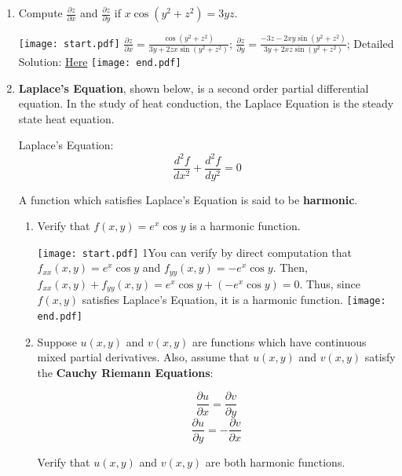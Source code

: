 \documentclass[12pt]{article}
\begin{document}
\begin{enumerate}
\item Compute $\frac{\partial z}{\partial x}$ and $\frac{\partial z}{\partial y}$ if $x\cos{(y^2+z^2)}=3yz$.

\texttt{[image: start.pdf]}
{{$\frac{\partial z}{\partial x}=\frac{\cos{(y^2+z^2)}}{3y+2zx\sin{(y^2+z^2)}}$; $\frac{\partial z}{\partial y}=\frac{-3z-2xy\sin{(y^2+z^2)}}{3y+2xz\sin{(y^2+z^2)}}$; Detailed Solution: \textcolor{blue}{\href{http://www.math.drexel.edu/classes/Calculus/resources/Math200HW/Solutions/10_200_Partial_17.pdf}{Here}} }}
\texttt{[image: end.pdf]}


\item {\bf Laplace's Equation}, shown below, is a second order partial differential equation.  In the study of heat conduction, the Laplace Equation is the steady state heat equation.
\begin{center}
Laplace's Equation:
$$\frac{d^2f}{dx^2}+\frac{d^2f}{dy^2}=0$$
\end{center}

A function which satisfies Laplace's Equation is said to be {\bf harmonic}.

\begin{enumerate}

\item Verify that $f(x,y)=e^x\cos{y}$ is a harmonic function.

\texttt{[image: start.pdf]}
{{{1\linewidth}{You can verify by direct computation that $f_{xx}(x,y)=e^x\cos{y}$ and $f_{yy}(x,y)=-e^x\cos{y}$.  Then, $f_{xx}(x,y)+f_{yy}(x,y)=e^x\cos{y}+\left(-e^x\cos{y}\right)=0$.  Thus, since $f(x,y)$ satisfies Laplace's Equation, it is a harmonic function.}}}
\texttt{[image: end.pdf]}


\item Suppose $u(x,y)$ and $v(x,y)$ are functions which have continuous mixed partial derivatives.  Also, assume that $u(x,y)$ and $v(x,y)$ satisfy the {\bf Cauchy Riemann Equations}:

$$\frac{\partial u}{\partial x}=\frac{\partial v}{\partial y}$$
$$\frac{\partial u}{\partial y}=-\frac{\partial v}{\partial x}$$

Verify that $u(x,y)$ and $v(x,y)$ are both harmonic functions.


\end{enumerate}
\end{enumerate}
\end{document}
